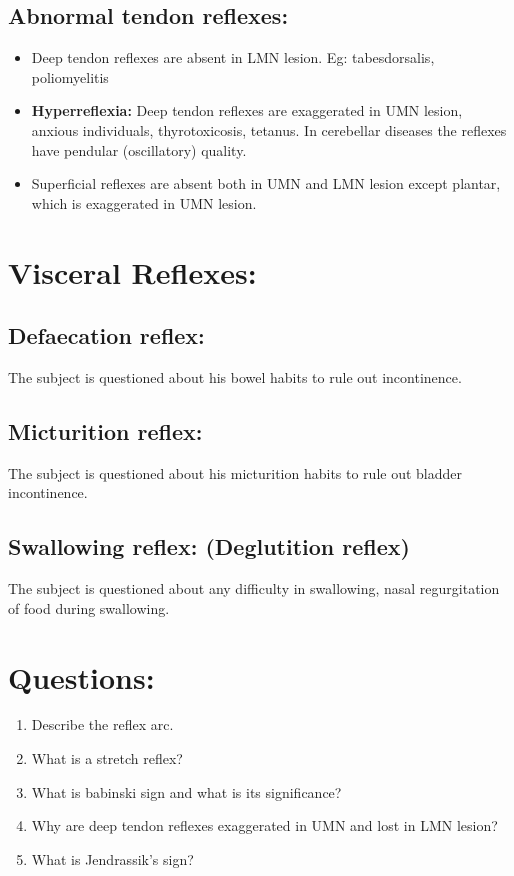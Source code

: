 \documentclass[a4paper,12pt]{book}
\begin{document}
\subsection*{Abnormal tendon reflexes:}
\begin{itemize}
\item{Deep tendon reflexes are absent in LMN lesion. Eg: tabesdorsalis, poliomyelitis}
\item{\textbf{Hyperreflexia:} Deep tendon reflexes are exaggerated in UMN lesion, anxious individuals, thyrotoxicosis, tetanus. In cerebellar diseases the reflexes have pendular (oscillatory) quality.}
\item{Superficial reflexes are absent both in UMN and LMN lesion except plantar, which is exaggerated in UMN lesion.}
\end{itemize}
\section*{Visceral Reflexes:}
\subsection*{Defaecation reflex:}
The subject is questioned about his bowel habits to rule out incontinence.
\subsection*{Micturition reflex:}
The subject is questioned about his micturition habits to rule out bladder incontinence.
\subsection*{Swallowing reflex: (Deglutition reflex)}
The subject is questioned about any difficulty in swallowing, nasal regurgitation of food during swallowing.
\section*{Questions:}
\begin{enumerate}
\item{Describe the reflex arc.}
\item{What is a stretch reflex?}
\item{What is babinski sign and what is its significance?}
\item{Why are deep tendon reflexes exaggerated in UMN and lost in LMN lesion?}
\item{What is Jendrassik's sign?}
\end{enumerate}
\end{document}

